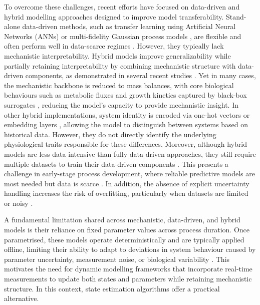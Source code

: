 To overcome these challenges, recent efforts have focused on data-driven and hybrid modelling approaches designed to improve model transferability. Stand-alone data-driven methods, such as transfer learning using Artificial Neural Networks (ANNs) \cite{Rogers2022AData} or multi-fidelity Gaussian process models \cite{Sun2022Multi-fidelityData, Martens2025HolisticOptimization}, are flexible and often perform well in data-scarce regimes \cite{KarimiAlavijeh2024ADevelopments}. However, they typically lack mechanistic interpretability. Hybrid models improve generalizability while partially retaining interpretability by combining mechanistic structure with data-driven components, as demonstrated in several recent studies \cite{Narayanan2019AProteins, Bayer2021ModelExperiments, Bayer2023ComparisonPaths, Pinto2023HybridNetworks, Ramos2024DeepEquations, Cruz-Bournazou2022HybridCultures}. Yet in many cases, the mechanistic backbone is reduced to mass balances, with core biological behaviours such as metabolic fluxes and growth kinetics captured by black-box surrogates \cite{Narayanan2019AProteins, Tsopanoglou2021MovingBioprocesses}, reducing the model's capacity to provide mechanistic insight. In other hybrid implementations, system identity is encoded via one-hot vectors \cite{Helleckes2024NovelBioprocesses} or embedding layers \cite{Hutter2021KnowledgeVectors}, allowing the model to distinguish between systems based on historical data. However, they do not directly identify the underlying physiological traits responsible for these differences. Moreover, although hybrid models are less data-intensive than fully data-driven approaches, they still require multiple datasets to train their data-driven components \cite{Bayer2023ComparisonPaths}. This presents a challenge in early-stage process development, where reliable predictive models are most needed but data is scarce \cite{Lu2024Multi-cell-lineModels}. In addition, the absence of explicit uncertainty handling increases the risk of overfitting, particularly when datasets are limited or noisy \cite{Schweidtmann2024AMethodologies}. 

A fundamental limitation shared across mechanistic, data-driven, and hybrid models is their reliance on fixed parameter values across process duration. Once parametrised, these models operate deterministically and are typically applied offline, limiting their ability to adapt to deviations in system behaviour caused by parameter uncertainty, measurement noise, or biological variability \cite{HernandezRodriguez2021DynamicTrain, Sinner2022OnlineMixture}. This motivates the need for dynamic modelling frameworks that incorporate real-time measurements to update both states and parameters while retaining mechanistic structure. In this context, state estimation algorithms offer a practical alternative.

